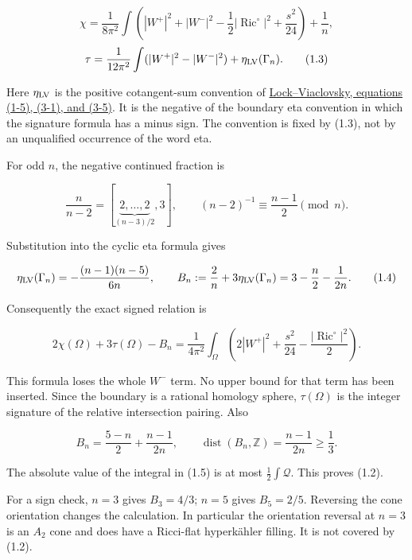 \documentclass[
  10pt,
]{article}
\begin{document}
\[
 \chi=\frac1{8\pi^2}\int
       \left(|W^+|^2+|W^-|^2-\frac12|\operatorname{Ric}^{\circ}|^2
                                      +\frac{s^2}{24}\right)+\frac1n,
\] \[
 \tau=\frac1{12\pi^2}\int(|W^+|^2-|W^-|^2)
                                      +\eta_{\rm LV}(\Gamma_n).
                                                        \tag{1.3}
\]

Here \(\eta_{\rm LV}\) is the positive cotangent-sum convention of
\href{https://msp.org/gt/2016/20-3/gt-v20-n3-p13-s.pdf}{Lock--Viaclovsky,
equations (1-5), (3-1), and (3-5)}. It is the negative of the boundary
eta convention in which the signature formula has a minus sign. The
convention is fixed by (1.3), not by an unqualified occurrence of the
word eta.

For odd \(n\), the negative continued fraction is

\[
 \frac{n}{n-2}=[\underbrace{2,\ldots,2}_{(n-3)/2},3],
 \qquad (n-2)^{-1}\equiv\frac{n-1}{2}\pmod n.
\]

Substitution into the cyclic eta formula gives

\[
 \eta_{\rm LV}(\Gamma_n)
       =-\frac{(n-1)(n-5)}{6n},\qquad
 B_n:=\frac2n+3\eta_{\rm LV}(\Gamma_n)
       =3-\frac n2-\frac1{2n}.
                                                        \tag{1.4}
\]

Consequently the exact signed relation is

\[
 2\chi(\Omega)+3\tau(\Omega)-B_n
 =\frac1{4\pi^2}\int_\Omega
       \left(2|W^+|^2+\frac{s^2}{24}
                                  -\frac{|\operatorname{Ric}^{\circ}|^2}{2}\right).
                                                        \tag{1.5}
\]

This formula loses the whole \(W^-\) term. No upper bound for that term
has been inserted. Since the boundary is a rational homology sphere,
\(\tau(\Omega)\) is the integer signature of the relative intersection
pairing. Also

\[
 B_n=\frac{5-n}{2}+\frac{n-1}{2n},\qquad
 \operatorname{dist}(B_n,\mathbb Z)=\frac{n-1}{2n}\ge\frac13.
                                                        \tag{1.6}
\]

The absolute value of the integral in (1.5) is at most
\(\tfrac12\int\mathscr Q\). This proves (1.2).

For a sign check, \(n=3\) gives \(B_3=4/3\); \(n=5\) gives \(B_5=2/5\).
Reversing the cone orientation changes the calculation. In particular
the orientation reversal at \(n=3\) is an \(A_2\) cone and does have a
Ricci-flat hyperkähler filling. It is not covered by (1.2).
\end{document}
